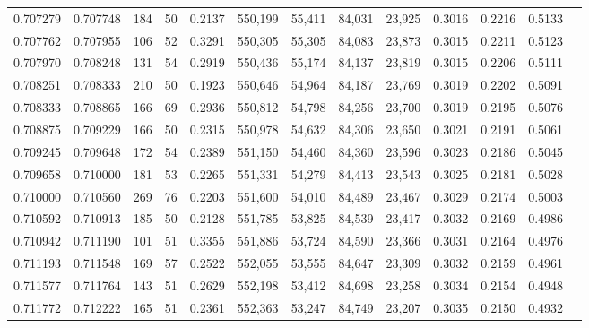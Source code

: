 \begin{tabular}{rrrrrrrrrrrrr}
0.707279 & 0.707748 &    184 &    50 &                                     0.2137 & 550,199 &  55,411 &  84,031 &  23,925 & 0.3016 & 0.2216 & 0.5133 \\
0.707762 & 0.707955 &    106 &    52 &                                     0.3291 & 550,305 &  55,305 &  84,083 &  23,873 & 0.3015 & 0.2211 & 0.5123 \\
0.707970 & 0.708248 &    131 &    54 &                                     0.2919 & 550,436 &  55,174 &  84,137 &  23,819 & 0.3015 & 0.2206 & 0.5111 \\
0.708251 & 0.708333 &    210 &    50 &                                     0.1923 & 550,646 &  54,964 &  84,187 &  23,769 & 0.3019 & 0.2202 & 0.5091 \\
0.708333 & 0.708865 &    166 &    69 &                                     0.2936 & 550,812 &  54,798 &  84,256 &  23,700 & 0.3019 & 0.2195 & 0.5076 \\
0.708875 & 0.709229 &    166 &    50 &                                     0.2315 & 550,978 &  54,632 &  84,306 &  23,650 & 0.3021 & 0.2191 & 0.5061 \\
0.709245 & 0.709648 &    172 &    54 &                                     0.2389 & 551,150 &  54,460 &  84,360 &  23,596 & 0.3023 & 0.2186 & 0.5045 \\
0.709658 & 0.710000 &    181 &    53 &                                     0.2265 & 551,331 &  54,279 &  84,413 &  23,543 & 0.3025 & 0.2181 & 0.5028 \\
0.710000 & 0.710560 &    269 &    76 &                                     0.2203 & 551,600 &  54,010 &  84,489 &  23,467 & 0.3029 & 0.2174 & 0.5003 \\
0.710592 & 0.710913 &    185 &    50 &                                     0.2128 & 551,785 &  53,825 &  84,539 &  23,417 & 0.3032 & 0.2169 & 0.4986 \\
0.710942 & 0.711190 &    101 &    51 &                                     0.3355 & 551,886 &  53,724 &  84,590 &  23,366 & 0.3031 & 0.2164 & 0.4976 \\
0.711193 & 0.711548 &    169 &    57 &                                     0.2522 & 552,055 &  53,555 &  84,647 &  23,309 & 0.3032 & 0.2159 & 0.4961 \\
0.711577 & 0.711764 &    143 &    51 &                                     0.2629 & 552,198 &  53,412 &  84,698 &  23,258 & 0.3034 & 0.2154 & 0.4948 \\
0.711772 & 0.712222 &    165 &    51 &                                     0.2361 & 552,363 &  53,247 &  84,749 &  23,207 & 0.3035 & 0.2150 & 0.4932 \\

\end{tabular}
